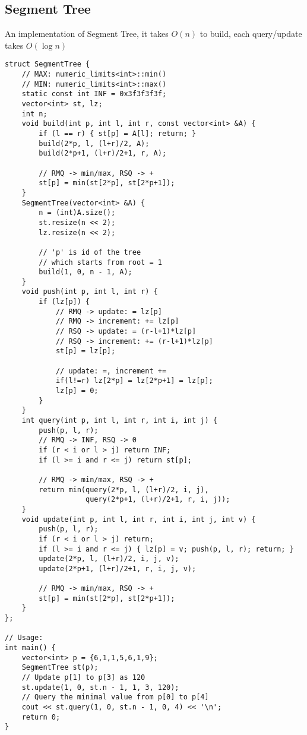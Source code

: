 \documentclass[10pt]{article}{\twocolumn}
\begin{document}
\subsection{Segment Tree}
An implementation of Segment Tree, it takes $O(n)$ to build, each query/update takes $O(\log{n})$
\begin{lstlisting}
struct SegmentTree {
    // MAX: numeric_limits<int>::min()
    // MIN: numeric_limits<int>::max()
    static const int INF = 0x3f3f3f3f;
    vector<int> st, lz;
    int n;
    void build(int p, int l, int r, const vector<int> &A) {
        if (l == r) { st[p] = A[l]; return; }
        build(2*p, l, (l+r)/2, A);
        build(2*p+1, (l+r)/2+1, r, A);
        
        // RMQ -> min/max, RSQ -> +
        st[p] = min(st[2*p], st[2*p+1]);
    }
    SegmentTree(vector<int> &A) {
        n = (int)A.size();
        st.resize(n << 2);
        lz.resize(n << 2);
        
        // 'p' is id of the tree
        // which starts from root = 1
        build(1, 0, n - 1, A);
    }
    void push(int p, int l, int r) {
        if (lz[p]) {
            // RMQ -> update: = lz[p]
            // RMQ -> increment: += lz[p]
            // RSQ -> update: = (r-l+1)*lz[p]
            // RSQ -> increment: += (r-l+1)*lz[p]
            st[p] = lz[p];
            
            // update: =, increment +=
            if(l!=r) lz[2*p] = lz[2*p+1] = lz[p];
            lz[p] = 0;
        }
    }
    int query(int p, int l, int r, int i, int j) {
        push(p, l, r);
        // RMQ -> INF, RSQ -> 0
        if (r < i or l > j) return INF;
        if (l >= i and r <= j) return st[p];
        
        // RMQ -> min/max, RSQ -> +
        return min(query(2*p, l, (l+r)/2, i, j),
                   query(2*p+1, (l+r)/2+1, r, i, j));
    }
    void update(int p, int l, int r, int i, int j, int v) {
        push(p, l, r);
        if (r < i or l > j) return;
        if (l >= i and r <= j) { lz[p] = v; push(p, l, r); return; }
        update(2*p, l, (l+r)/2, i, j, v);
        update(2*p+1, (l+r)/2+1, r, i, j, v);
        
        // RMQ -> min/max, RSQ -> +
        st[p] = min(st[2*p], st[2*p+1]);
    }
};

// Usage:
int main() {
    vector<int> p = {6,1,1,5,6,1,9};
    SegmentTree st(p);
    // Update p[1] to p[3] as 120
    st.update(1, 0, st.n - 1, 1, 3, 120);
    // Query the minimal value from p[0] to p[4]
    cout << st.query(1, 0, st.n - 1, 0, 4) << '\n';
    return 0;
}
\end{lstlisting}
\end{document}
